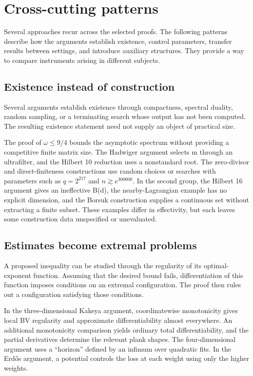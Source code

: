 \documentclass[11pt]{article}
\begin{document}
\section{\texorpdfstring{Cross-cutting patterns}{Cross-cutting patterns}}\label{sec:patterns}

Several approaches recur across the selected proofs. The following patterns describe how the arguments establish existence, control parameters, transfer results between settings, and introduce auxiliary structures. They provide a way to compare instruments arising in different subjects.

\subsection{\texorpdfstring{Existence instead of construction}{Existence instead of construction}}

Several arguments establish existence through compactness, spectral duality, random sampling, or a terminating search whose output has not been computed. The resulting existence statement need not supply an object of practical size.

The proof of $\omega \le 9/4$ bounds the asymptotic spectrum without providing a competitive finite matrix size. The Hadwiger argument selects m through an ultrafilter, and the Hilbert 10 reduction uses a nonstandard root. The zero-divisor and direct-finiteness constructions use random choices or searches with parameters such as $q=2^{217}$ and $n\gtrsim e^{300000}$. In the second group, the Hilbert 16 argument gives an ineffective B(d), the nearby-Lagrangian example has no explicit dimension, and the Borsuk construction supplies a continuous set without extracting a finite subset. These examples differ in effectivity, but each leaves some construction data unspecified or unevaluated.

\subsection{\texorpdfstring{Estimates become extremal problems}{Estimates become extremal problems}}

A proposed inequality can be studied through the regularity of its optimal-exponent function. Assuming that the desired bound fails, differentiation of this function imposes conditions on an extremal configuration. The proof then rules out a configuration satisfying those conditions.

In the three-dimensional Kakeya argument, coordinatewise monotonicity gives local BV regularity and approximate differentiability almost everywhere. An additional monotonicity comparison yields ordinary total differentiability, and the partial derivatives determine the relevant plank shapes. The four-dimensional argument uses a ``horizon'' defined by an infimum over quadratic fits. In the Erd\H{o}s argument, a potential controls the loss at each weight using only the higher weights.
\end{document}
